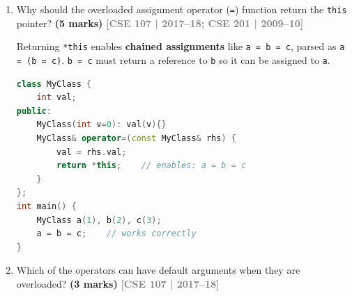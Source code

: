 \documentclass[12pt,a3paper]{article}
\newcommand{\yr}[1]{\hfill\textcolor{gray}{\small\textbf{[#1]}}}
\newcommand{\mk}[1]{\textcolor{orange!70!black}{\small\textbf{(#1 marks)}}}
\begin{document}
\begin{enumerate}
\begin{tcolorbox}[enhanced,breakable,ansbox,colback=cF!4,colframe=cF,
  boxrule=0.8pt,arc=5pt,
  title={\textbf{Answer --- Fraction prefix ++ as friend}},
  fonttitle=\bfseries\color{white},colbacktitle=cF]

\begin{lstlisting}[language=C++]
#include <iostream>
using namespace std;
class Fraction{
    int x,y;
public:
    Fraction(int a,int b):x(a),y(b){}
    int getx(){return x;} int gety(){return y;}
    friend Fraction& operator++(Fraction& f){ f.x++; f.y++; return f; }
};
int main(){
    Fraction n(3,7);
    ++n;
    cout<<"x/y: "<<n.getx()<<"/"<<n.gety()<<"\n"; // x/y: 4/8
}
\end{lstlisting}

\end{tcolorbox}


\item Why should the overloaded assignment operator (\texttt{=}) function return the \texttt{this} pointer? \mk{5}
\yr{CSE 107 | 2017--18; CSE 201 | 2009--10}

\begin{tcolorbox}[enhanced,breakable,ansbox,colback=cF!4,colframe=cF,
  boxrule=0.8pt,arc=5pt,
  title={\textbf{Answer --- Why operator= should return *this}},
  fonttitle=\bfseries\color{white},colbacktitle=cF]

Returning \texttt{*this} enables \textbf{chained assignments}
like \texttt{a = b = c}, parsed as \texttt{a = (b = c)}.
\texttt{b = c} must return a reference to \texttt{b} so it can
be assigned to \texttt{a}.

\begin{lstlisting}[language=C++]
class MyClass {
    int val;
public:
    MyClass(int v=0): val(v){}
    MyClass& operator=(const MyClass& rhs) {
        val = rhs.val;
        return *this;    // enables: a = b = c
    }
};
int main() {
    MyClass a(1), b(2), c(3);
    a = b = c;    // works correctly
}
\end{lstlisting}

\end{tcolorbox}

\item Which of the operators can have default arguments when they are overloaded? \mk{3}
\yr{CSE 107 | 2017--18}


\begin{tcolorbox}[enhanced,breakable,ansbox,colback=cF!4,colframe=cF,
  boxrule=0.8pt,arc=5pt,
  title={\textbf{Answer --- Which operators can have default arguments?}},
  fonttitle=\bfseries\color{white},colbacktitle=cF]


\end{tcolorbox}
\end{enumerate}
\end{document}
